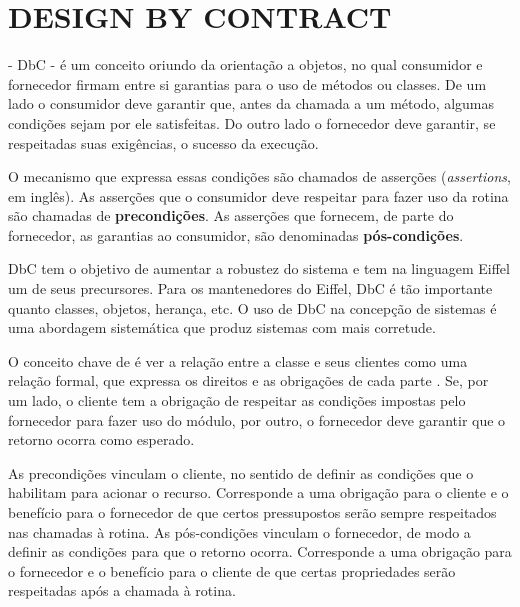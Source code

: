 
\section{DESIGN BY CONTRACT}
\label{Design-by-Contract}
\vspace{-6mm}

\designbycontract{} \cite{meyer1992applying} - DbC - é um conceito
oriundo da orientação a objetos, no qual consumidor e fornecedor firmam entre si garantias para
o uso de métodos ou classes. De um lado o consumidor deve garantir que, antes da
chamada a um método, algumas condições sejam por ele satisfeitas.
Do outro lado o fornecedor deve garantir, se respeitadas suas exigências,
o sucesso da execução.

O mecanismo que expressa essas condições são chamados de asserções
(\textit{assertions}, em inglês). As asserções que o consumidor deve respeitar
para fazer uso da rotina são chamadas de \textbf{precondições}. As asserções que
fornecem, de parte do fornecedor, as garantias ao consumidor, são denominadas
\textbf{pós-condições}.

DbC tem o objetivo de aumentar a robustez do sistema e tem na linguagem Eiffel
\cite{meyer1988eiffel} um de seus precursores. Para os mantenedores do Eiffel, DbC é
tão importante quanto classes, objetos, herança, etc. O uso de DbC na
concepção de sistemas é uma abordagem sistemática que produz sistemas com mais
corretude.

O conceito chave de \designbycontract{} é ver a relação entre a classe e
seus clientes como uma relação formal, que expressa os direitos e as
obrigações de cada parte \cite{meyer1997object}. Se, por um lado, o
cliente tem a obrigação de respeitar as condições impostas pelo fornecedor para fazer uso do módulo, por
outro, o fornecedor deve garantir que o retorno ocorra como esperado.

As precondições vinculam o cliente, no sentido de definir as condições que
o habilitam para acionar o recurso. Corresponde a uma obrigação para o cliente e
o benefício para o fornecedor \cite{meyer1997object} de que certos
pressupostos serão sempre respeitados nas chamadas à rotina.
As pós-condições vinculam o fornecedor, de modo a definir as condições para que o retorno ocorra.
Corresponde a uma obrigação para o fornecedor e o benefício para o cliente de
que certas propriedades serão respeitadas após a chamada à rotina.

